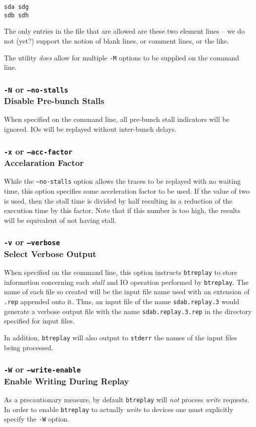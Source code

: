 \documentclass{article}
\begin{document}
\begin{verbatim}
sda sdg
sdb sdh
\end{verbatim}

The only entries in the file that are allowed are these two element lines
-- we do not (yet?) support the notion of blank lines, or comment lines, or
the like.

The utility \emph{does} allow for multiple \texttt{-M} options to be
supplied on the command line.

\subsubsection{\label{sec:o-N}\texttt{-N} or \texttt{--no-stalls}\\Disable
Pre-bunch Stalls}

When specified on the command line, all pre-bunch stall indicators will be
ignored. IOs will be replayed without inter-bunch delays.

\subsubsection{\label{sec:o-x}\texttt{-x} or \texttt{--acc-factor}\\Accelaration
Factor}

  While the \texttt{--no-stalls} option allows the traces to be replayed
  with no waiting time, this option specifies some acceleration factor
  to be used. If the value of two is used, then the stall time is
  divided by half resulting in a reduction of the execution time by
  this factor. Note that if this number is too high, the results will
  be equivalent of not having stall.

\subsubsection{\label{sec:p-o-v}\texttt{-v} or
\texttt{--verbose}\\Select Verbose Output}

When specified on the command line, this option instructs \texttt{btreplay}
to store information concerning each \emph{stall} and IO operation
performed by \texttt{btreplay}. The name of each file so created will be
the input file name used with an extension of \texttt{.rep} appended onto
it. Thus, an input file of the name \texttt{sdab.replay.3} would generate a
verbose output file with the name \texttt{sdab.replay.3.rep} in the
directory specified for input files.

In addition, \texttt{btreplay} will also output to \texttt{stderr} the
names of the input files being processed.

\subsubsection{\label{sec:p-o-W}\texttt{-W} or
\texttt{--write-enable}\\Enable Writing During Replay}

As a precautionary measure, by default \texttt{btreplay} will \emph{not}
process \emph{write} requests. In order to enable \texttt{btreplay} to
actually \emph{write} to devices one must explicitly specify the
\texttt{-W} option.
\end{document}
